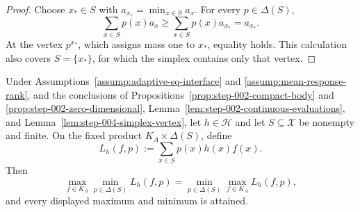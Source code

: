 \begin{proof}
Choose \(x_*\in S\) with \(a_{x_*}=\min_{x\in S}a_x\).  For every
\(p\in\Delta(S)\),
\[
\sum_{x\in S}p(x)a_x
\ge\sum_{x\in S}p(x)a_{x_*}
=a_{x_*}.
\]
At the vertex \(p^{x_*}\), which assigns mass one to \(x_*\), equality
holds.  This calculation also covers \(S=\{x_*\}\), for which the simplex
contains only that vertex.
\end{proof}

\begin{proposition}
\label{prop:step-004-sion-fixed-body}
Under Assumptions~\ref{assump:adaptive-sq-interface} and
\ref{assump:mean-response-rank}, and the conclusions of
Propositions~\ref{prop:step-002-compact-body} and
\ref{prop:step-002-zero-dimensional},
Lemma~\ref{lem:step-002-continuous-evaluations}, and
Lemma~\ref{lem:step-004-simplex-vertex}, let \(h\in\mathcal H\) and let
\(S\subseteq\mathcal X\) be nonempty and finite.  On the fixed product
\(K_A\times\Delta(S)\), define
\[
L_h(f,p):=\sum_{x\in S}p(x)h(x)f(x).
\]
Then
\[
\max_{f\in K_A}\min_{p\in\Delta(S)}L_h(f,p)
=\min_{p\in\Delta(S)}\max_{f\in K_A}L_h(f,p),
\]
and every displayed maximum and minimum is attained.
\end{proposition}

